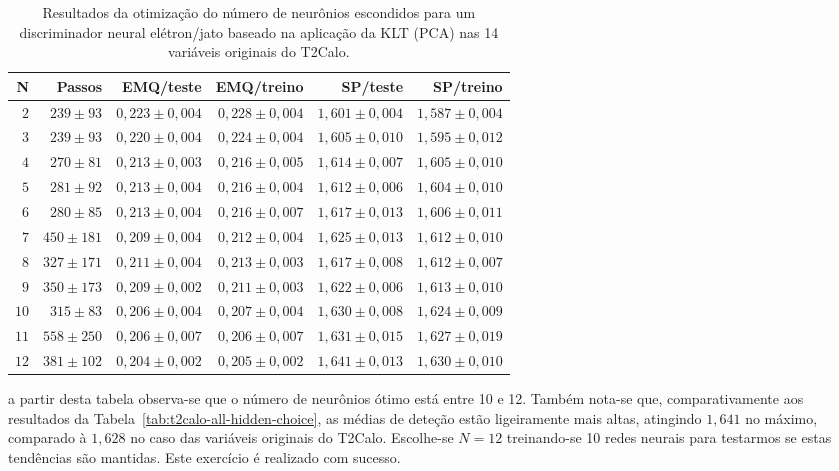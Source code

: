 \begin{table}
\caption{Resultados da otimização do número de neurônios escondidos para um
discriminador neural elétron/jato baseado na aplicação da KLT (PCA) nas 14
variáveis originais do T2Calo.}
\label{tab:t2calo-all-pca-choice}
\begin{center}
\begin{tabular}{|r|r|r|r|r|r|} \hline
N & Passos & EMQ/teste & EMQ/treino & SP/teste & SP/treino \\ \hline 
$2$ & $239\pm93$ & $0,223\pm0,004$ & $0,228\pm0,004$ & $1,601\pm0,004$ & $1,587\pm0,004$ \\
$3$ & $239\pm93$ & $0,220\pm0,004$ & $0,224\pm0,004$ & $1,605\pm0,010$ & $1,595\pm0,012$ \\
$4$ & $270\pm81$ & $0,213\pm0,003$ & $0,216\pm0,005$ & $1,614\pm0,007$ & $1,605\pm0,010$ \\
$5$ & $281\pm92$ & $0,213\pm0,004$ & $0,216\pm0,004$ & $1,612\pm0,006$ & $1,604\pm0,010$ \\
$6$ & $280\pm85$ & $0,213\pm0,004$ & $0,216\pm0,007$ & $1,617\pm0,013$ & $1,606\pm0,011$ \\
$7$ & $450\pm181$ & $0,209\pm0,004$ & $0,212\pm0,004$ & $1,625\pm0,013$ & $1,612\pm0,010$ \\
$8$ & $327\pm171$ & $0,211\pm0,004$ & $0,213\pm0,003$ & $1,617\pm0,008$ & $1,612\pm0,007$ \\
$9$ & $350\pm173$ & $0,209\pm0,002$ & $0,211\pm0,003$ & $1,622\pm0,006$ & $1,613\pm0,010$ \\
$10$ & $315\pm83$ & $0,206\pm0,004$ & $0,207\pm0,004$ & $1,630\pm0,008$ & $1,624\pm0,009$ \\
$11$ & $558\pm250$ & $0,206\pm0,007$ & $0,206\pm0,007$ & $1,631\pm0,015$ & $1,627\pm0,019$ \\
$12$ & $381\pm102$ & $0,204\pm0,002$ & $0,205\pm0,002$ & $1,641\pm0,013$ & $1,630\pm0,010$ \\
\hline
\end{tabular}
\end{center}
\end{table}

a partir desta tabela observa-se que o número de neurônios ótimo está entre 10
e 12. Também nota-se que, comparativamente aos resultados da
Tabela~\ref{tab:t2calo-all-hidden-choice}, as médias de deteção estão
ligeiramente mais altas, atingindo $1,641$ no máximo, comparado à $1,628$ no
caso das variáveis originais do T2Calo. Escolhe-se $N=12$ treinando-se 10
redes neurais para testarmos se estas tendências são mantidas. Este exercício
é realizado com sucesso.

